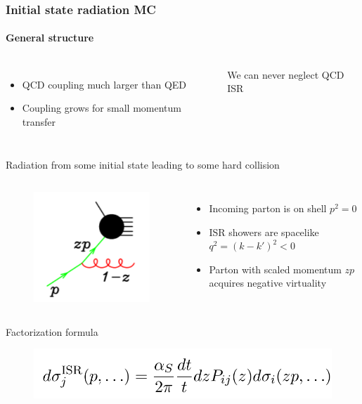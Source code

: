 \documentclass[aspectratio=43]{beamer}
\begin{document}
\begin{frame}

\frametitle{Initial state radiation MC}
\framesubtitle{General structure}
	
	\begin{columns}
	

		\begin{itemize}
			\item \footnotesize QCD coupling much larger than QED
			\item \footnotesize Coupling grows for small momentum transfer
		\end{itemize}

		
		 \footnotesize \color{red}We can never neglect QCD ISR
		 
	\end{columns}

	\vspace{0.5cm}

	\center \footnotesize Radiation from some initial state leading to some hard collision
	\begin{columns}
		
		\column{0.3\textwidth}
		
		\begin{figure}
			\includegraphics[width = 2.5 cm]{plots/ISR_shower0.png}
		\end{figure}
		
		\column{0.6\textwidth}
		
		\begin{itemize}
			\item \footnotesize Incoming parton is on shell $p^{2} = 0$
			\item \footnotesize ISR showers are spacelike $q^{2} = (k - k')^{2} < 0$
			\item \footnotesize Parton with scaled momentum $zp$ acquires negative virtuality
		\end{itemize}
	
	\end{columns}

	\vspace{0.25cm}
	
	\center \footnotesize Factorization formula
	\begin{figure}
		\includegraphics[width = 5.5 cm]{plots/ISR_shower0_eq.png}
	\end{figure}

\end{frame}
\end{document}
